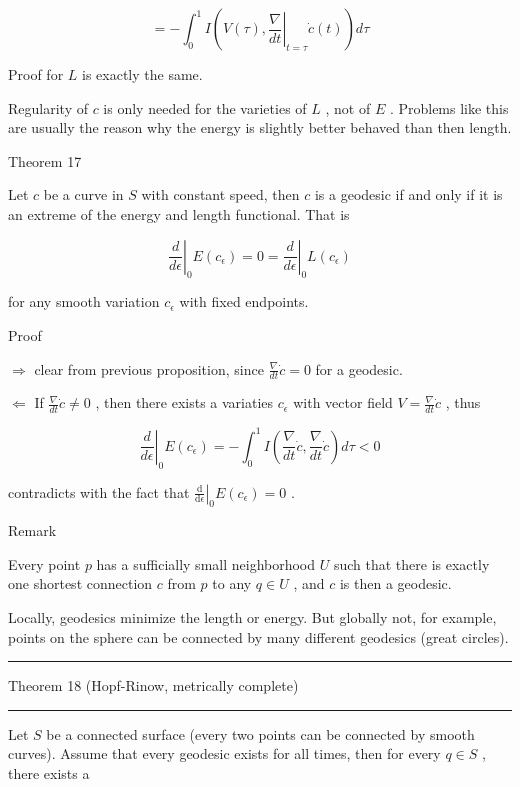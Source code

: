 \documentclass[lang=cn,a4paper,11pt,openany,twoside]{elegantbook}
\newcommand{\HRule}{\begin{center}\rule{0.9\linewidth}{0.2mm}\end{center}}
\begin{document}
\[
=  - {\int }_{0}^{1}I\left( {V\left( \tau \right) ,{\left. \frac{\nabla }{dt}\right| }_{t = \tau }\dot{c}\left( t\right) }\right) {d\tau }
\]

Proof for \(L\) is exactly the same.

Regularity of \(c\) is only needed for the varieties of \(L\) , not of \(E\) . Problems like this are usually the reason why the energy is slightly better behaved than then length.

Theorem 17

Let \(c\) be a curve in \(S\) with constant speed, then \(c\) is a geodesic if and only if it is an extreme of the energy and length functional. That is

\[
{\left. \frac{d}{d\epsilon }\right| }_{0}E\left( {c}_{\epsilon }\right)  = 0 = {\left. \frac{d}{d\epsilon }\right| }_{0}L\left( {c}_{\epsilon }\right)
\]

for any smooth variation \({c}_{\epsilon }\) with fixed endpoints.

Proof

\(\Rightarrow\) clear from previous proposition, since \(\frac{\nabla }{dt}\dot{c} = 0\) for a geodesic.

\(\Leftarrow\) If \(\frac{\nabla }{dt}\dot{c} \neq  0\) , then there exists a variaties \({c}_{\epsilon }\) with vector field \(V = \frac{\nabla }{dt}\dot{c}\) , thus

\[
{\left. \frac{d}{d\epsilon }\right| }_{0}E\left( {c}_{\epsilon }\right)  =  - {\int }_{0}^{1}I\left( {\frac{\nabla }{dt}\dot{c},\frac{\nabla }{dt}\dot{c}}\right) {d\tau } < 0
\]

contradicts with the fact that \({\left. \frac{\mathrm{d}}{\mathrm{d}\epsilon }\right| }_{0}E\left( {c}_{\epsilon }\right)  = 0\) .

Remark

Every point \(p\) has a sufficially small neighborhood \(U\) such that there is exactly one shortest connection \(c\) from \(p\) to any \(q \in  U\) , and \(c\) is then a geodesic.

Locally, geodesics minimize the length or energy. But globally not, for example, points on the sphere can be connected by many different geodesics (great circles).

\HRule

Theorem 18 (Hopf-Rinow, metrically complete)

\HRule

Let \(S\) be a connected surface (every two points can be connected by smooth curves). Assume that every geodesic exists for all times, then for every \(q \in  S\) , there exists a
\end{document}
